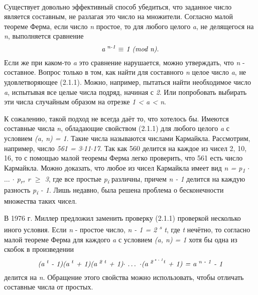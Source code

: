 \paragraph{} Существует довольно эффективный способ убедиться, что заданное число является составным, не разлагая это число на множители. 
Согласно малой теореме Ферма, если число \textit{n} простое, то для любого целого \textit{a}, не делящегося на \textit{n}, выполняется сравнение
\begin{equation}
 \textit{a\textsuperscript{ n-1} {$\equiv$} 1 (mod n)}.
\end{equation}
Если же при каком-то \textit{a} это сравнение нарушается, можно утверждать, что \textit{n} - составное. Вопрос только в том, как найти для составного \textit{n}
целое число \textit{a}, не удовлетворяющее (2.1.1). Можно, например, пытаться найти необходимое число \textit{a}, испытывая все целые числа подряд, 
начиная с \textit{2}. Или попробовать выбирать эти числа случайным образом на отрезке \textit{1 < a < n}.

  К сожалению, такой подход не всегда даёт то, что хотелось бы. Имеются составные числа \textit{n}, обладающие свойством (2.1.1) для любого целого
\textit{a} с условием \textit{(a, n) = 1}. Такие числа называются числами Кармайкла. Рассмотрим, например, число \textit{561 = 3{$\cdot$}11{$\cdot$}17}. 
Так как 560 делится на каждое из чисел 2, 10, 16, то с помощью малой теоремы Ферма легко проверить, что 561 есть число Кармайкла. 
Можно доказать, что любое из чисел Кармайкла имеет вид \textit{n = p\textsubscript{1} {$\cdot$} {$\dots$} {$\cdot$} p\textsubscript{r}, r {$\geq$} 3}, 
где все простые \textit{p\textsubscript{i}} различны, причем \textit{n - 1} делится на каждую разность \textit{p\textsubscript{i} - 1}. 
Лишь недавно, была решена проблема о бесконечности множества таких чисел.

  В 1976 г. Миллер предложил заменить проверку (2.1.1) проверкой несколько иного условия. Если \textit{n} - простое число, 
\textit{n - 1 = 2\textsuperscript{ s} t}, где \textit{t} нечётно, то согласно малой теореме Ферма для каждого \textit{a} с 
условием \textit{(a, n) = 1} хотя бы одна из скобок в произведении
\begin{equation}
 \textit{(a\textsuperscript{ t} - 1)(a\textsuperscript{ t} + 1)(a\textsuperscript{ 2 t} + 1){$\cdot$} {$\dots$} {$\cdot$}(a\textsuperscript{ 2\textsuperscript{ s - 1}t} + 1) = a\textsuperscript{ n - 1} - 1}
\end{equation}
делится на \textit{n}. Обращение этого свойства можно использовать, чтобы отличать составные числа от простых.

